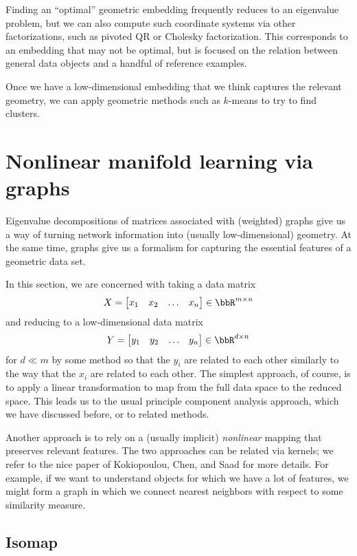 \documentclass[12pt, leqno]{article} %
\begin{document}
Finding an ``optimal'' geometric embedding frequently reduces to an
eigenvalue problem, but we can also compute such coordinate systems
via other factorizations, such as pivoted QR or Cholesky
factorization.  This corresponds to an embedding that may not be
optimal, but is focused on the relation between general data objects
and a handful of reference examples.

Once we have a low-dimensional embedding that we think captures the
relevant geometry, we can apply geometric methods such as $k$-means
to try to find clusters.

\section{Nonlinear manifold learning via graphs}

Eigenvalue decompositions of matrices associated with (weighted)
graphs give us a way of turning network information into (usually
low-dimensional) geometry.  At the same time, graphs give us a
formalism for capturing the essential features of a geometric data
set.

In this section, we are concerned with taking a data matrix
\[
  X = \begin{bmatrix} x_1 & x_2 & \ldots & x_n \end{bmatrix} \in
  \bbR^{m \times n}
\]
and reducing to a low-dimensional data matrix
\[
  Y = \begin{bmatrix} y_1 & y_2 & \ldots & y_n \end{bmatrix} \in
  \bbR^{d \times n}
\]
for $d \ll m$ by some method so that the $y_i$ are related to each
other similarly to the way that the $x_i$ are related to each other.
The simplest approach, of course, is to apply a linear transformation
to map from the full data space to the reduced space.  This leads us
to the usual principle component analysis approach, which we have
discussed before, or to related methods.

Another approach is to rely on a (usually implicit) {\em nonlinear}
mapping that preserves relevant features.  The two approaches can be
related via kernels; we refer to the nice paper of Kokiopoulou, Chen,
and Saad for more details.  For example, if we want to understand
objects for which we have a lot of features, we might form a graph in
which we connect nearest neighbors with respect to some similarity
measure.

\subsection{Isomap}
\end{document}
